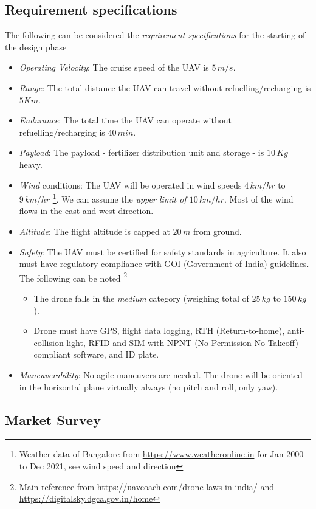 \subsection{Requirement specifications}

The following can be considered the \emph{requirement specifications} for the starting of the design phase

\begin{itemize}
    \item \textit{Operating Velocity}: The cruise speed of the UAV is $5 \, m/s$.
    \item \textit{Range}: The total distance the UAV can travel without refuelling/recharging is $5 Km$.
    \item \textit{Endurance}: The total time the UAV can operate without refuelling/recharging is $40 \, min$.
    \item \textit{Payload}: The payload - fertilizer distribution unit and storage - is $10 \, Kg$ heavy.
    \item \textit{Wind} conditions: The UAV will be operated in wind speeds $4 \, km/hr$ to $9 \, km/hr$ \footnote{Weather data of Bangalore from \url{https://www.weatheronline.in} for Jan 2000 to Dec 2021, see wind speed and direction}. We can assume the \emph{upper limit of $10 \, km/hr$}. Most of the wind flows in the east and west direction.
    \item \textit{Altitude}: The flight altitude is capped at $20 \, m$ from ground.
    \item \textit{Safety}: The UAV must be certified for safety standards in agriculture. It also must have regulatory compliance with GOI (Government of India) guidelines. The following can be noted \footnote{Main reference from \url{https://uavcoach.com/drone-laws-in-india/} and \url{https://digitalsky.dgca.gov.in/home}}
    \begin{itemize}
        \item The drone falls in the \emph{medium} category (weighing total of $25 \, kg$ to $150 \, kg$).
        \item Drone must have GPS, flight data logging, RTH (Return-to-home), anti-collision light, RFID and SIM with NPNT (No Permission No Takeoff) compliant software, and ID plate.
    \end{itemize}
    \item \textit{Maneuverability}: No agile maneuvers are needed. The drone will be oriented in the horizontal plane virtually always (no pitch and roll, only yaw).
\end{itemize}

\subsection{Market Survey}
